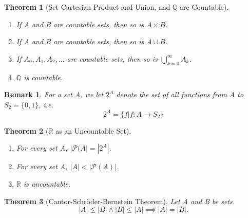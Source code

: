 \documentclass[11pt, oneside]{book}
\theoremstyle{break}
\newtheorem{thm}{Theorem}[section]
\newtheorem*{remark}{Remark}
\newcommand{\bb}[1]{\mathbb{#1}}			%
\begin{document}
\begin{thm}[Set Cartesian Product and Union, and $\bb{Q}$ are Countable]
	\begin{enumerate}
		\item If A and B are countable sets, then so is $A \times B$.
		\item If A and B are countable sets, then so is $A \cup B$.
		\item If $A_0, A_1, A_2, ...$ are countable sets, then so is $\bigcup_{k = 0}^{\infty} A_k$.
		\item $\bb{Q}$ is countable.
	\end{enumerate}
\end{thm}

\begin{remark}
	For a set A, we let $2^A$ denote the set of all functions from A to $S_2 = \{0, 1\}$, i.e.
	\[
		2^A = \{f | f: A \to S_2 \}
	\]
\end{remark}

\begin{thm}[$\bb{R}$ as an Uncountable Set]
	\begin{enumerate}
		\item For every set A, $|\mathcal{P}(A| = |2^A|$.
		\item For every set A, $|A| < |\mathcal{P}(A)|$.
		\item $\bb{R}$ is uncountable.
	\end{enumerate}
\end{thm}

\begin{thm}[Cantor-Schröder-Bernstein Theorem]
	Let A and B be sets.
	\[
		|A| \leq |B| \land |B| \leq |A| \implies |A| = |B|.
	\]
\end{thm}
\end{document}
